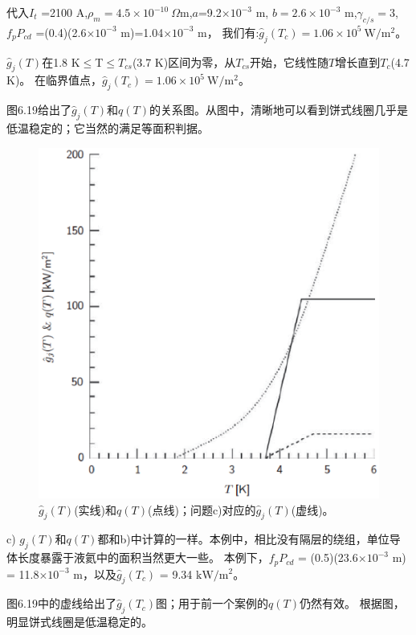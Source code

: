 代入$I_t$ =2100 A,$\rho_m =4.5\times 10^{-10}\ \Omega \mathrm{m}$,$a$=9.2$\times 10^{-3}$ m, $b=2.6\times 10^{-3}$ m,$\gamma_{c/s}=3$,$f_p P_{cd}$ =(0.4)(2.6$\times 10^{−3}$ m)=1.04$\times 10^{−3}$ m，
我们有:$\hat{g}_j(T_c)=1.06\times 10^5\ \mathrm{W/m^2}$。

$\hat{g}_j(T)$在1.8 K$\le$T$\le T_{cs}$(3.7 K)区间为零，从$T_{cs}$开始，它线性随$T$增长直到$T_c$(4.7 K)。
在临界值点，$\hat{g}_j(T_c)=1.06\times 10^5\ \mathrm{W/m^2}$。

图6.19给出了$\hat{g}_j(T)$和$q(T)$的关系图。从图中，清晰地可以看到饼式线圈几乎是低温稳定的；它当然的满足等面积判据。
\begin{figure}[htbp]
	\centering
	\includegraphics[scale=0.6]{chpt6/figs/fig6.19.eps}
	\caption{$\hat{g}_j(T)$(实线)和$q(T)$(点线)；问题c)对应的$\hat{g}_j(T)$(虚线)。}
\end{figure}

c) $g_j(T)$和$q(T)$都和b)中计算的一样。本例中，相比没有隔层的绕组，单位导体长度暴露于液氦中的面积当然更大一些。
本例下，$f_p P_{cd}$ = (0.5)(23.6$\times 10^{-3}$ m) = 11.8$\times 10^{-3}$ m，以及$\hat{g}_j(T_c)$
= 9.34 $\mathrm{kW/m^2}$。

图6.19中的虚线给出了$\hat{g}_j(T_c)$图；用于前一个案例的$q(T)$仍然有效。
根据图，明显饼式线圈是低温稳定的。

